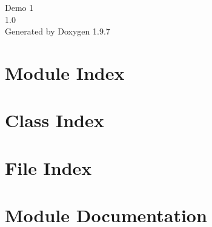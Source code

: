 \documentclass[twoside]{book}
\newcommand{\+}{\discretionary{\mbox{\scriptsize$\hookleftarrow$}}{}{}}
\newcommand{\clearemptydoublepage}{%
    \newpage{\pagestyle{empty}\cleardoublepage}%
  }
\begin{document}
  \raggedbottom
    \hypersetup{pageanchor=false,
                bookmarksnumbered=true,
                pdfencoding=unicode
               }
  \begin{titlepage}
  \vspace*{7cm}
  \begin{center}%
  {\Large Demo 1}\\
  [1ex]\large 1.\+0 \\
  \vspace*{1cm}
  {\large Generated by Doxygen 1.9.7}\\
  \end{center}
  \end{titlepage}
  \clearemptydoublepage
  \tableofcontents
  \clearemptydoublepage
  \hypersetup{pageanchor=true}
\chapter{Module Index}

\chapter{Class Index}

\chapter{File Index}

\chapter{Module Documentation}





















\end{document}
